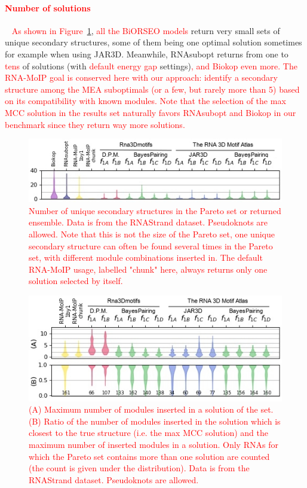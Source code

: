 \documentclass{bioinfo}
\begin{document}
\paragraph{\textcolor{red}{Number of solutions}} ~ \textcolor{red}{As shown in Figure~\ref{fig:nsol}}, \textcolor{red}{all the BiORSEO models} return very small sets of unique secondary structures, some of them being one optimal solution sometimes for example when using JAR3D. Meanwhile, RNAsubopt returns from one to \textcolor{red}{tens} of solutions (with \textcolor{red}{default energy gap} settings)\textcolor{red}{, and Biokop even more. The RNA-MoIP goal is conserved here with our approach: identify a secondary structure among the MEA suboptimals (or a few, but rarely more than 5) based on its compatibility with known modules. Note that the selection of the max MCC solution in the results set naturally favors RNAsubopt and Biokop in our benchmark since they return way more solutions.}
\begin{figure}[!tbp]
  \includegraphics[width=\linewidth]{Nsol.jpg}
  \caption{\textcolor{red}{Number of unique secondary structures in the Pareto set or returned ensemble. Data is from the RNAStrand dataset. Pseudoknots are allowed. Note that this is not the size of the Pareto set, one unique secondary structure can often be found several times in the Pareto set, with different module combinations inserted in. The default RNA-MoIP usage, labelled "chunk" here, always returns only one solution selected by itself.}}
  \label{fig:nsol}
\end{figure}
\begin{figure}[!tbp]
  \includegraphics[width=\linewidth]{Nmotifs.jpg}
  \caption{\textcolor{red}{(A) Maximum number of modules inserted in a solution of the set. (B) Ratio of the number of modules inserted in the solution which is closest to the true structure (i.e. the max MCC solution) and the maximum number of inserted modules in a solution. Only RNAs for which the Pareto set contains more than one solution are counted (the count is given under the distribution). Data is from the RNAStrand dataset. Pseudoknots are allowed.}}
  \label{fig:info}
\end{figure}
\end{document}
